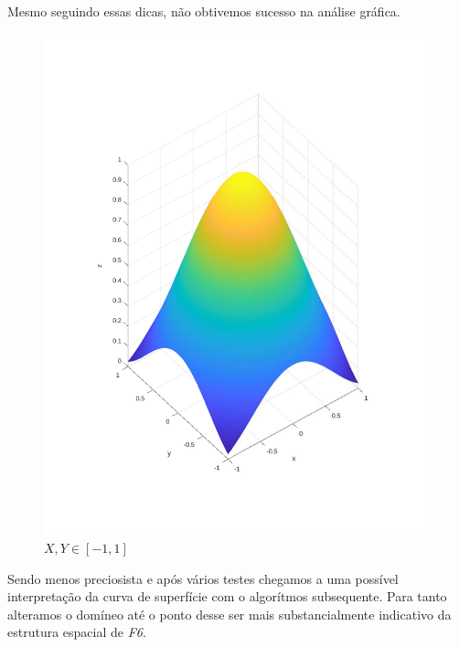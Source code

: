 \documentclass{article}
\begin{document}


\newpage
Mesmo seguindo essas dicas, não obtivemos sucesso na análise gráfica.

\begin{figure}[h!]
\centering
\includegraphics[scale=.5]{images/myplot4.pdf}
\caption{$X,Y \in [-1, 1]$}
\label{fig:plot4_f6}
\end{figure}

Sendo menos preciosista e após vários testes chegamos a uma possível interpretação da curva de superfície com o algorítmos subsequente. Para tanto alteramos o domíneo até o ponto desse ser mais substancialmente indicativo da estrutura espacial de \emph{F6}.


\end{document}
